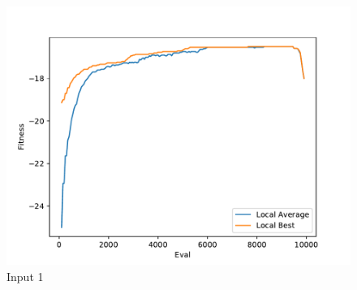 \documentclass{standalone}
\begin{document}
\begin{figure}[!htb]
	\caption{Input 1}
	\label{fig:graph_1006}
	\includegraphics[width=\textwidth]{../graphs/graphs/1006.pdf}
\end{figure}
\end{document}
